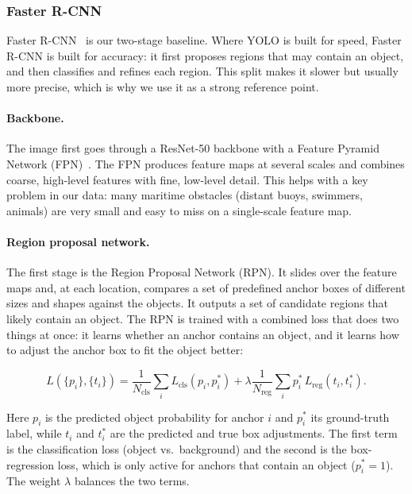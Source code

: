 \documentclass[11pt,a4paper]{article}
\begin{document}
\subsubsection{Faster R-CNN}
Faster R-CNN~\cite{fasterrcnn2015} is our two-stage baseline. Where YOLO is built
for speed, Faster R-CNN is built for accuracy: it first proposes regions that may
contain an object, and then classifies and refines each region. This split makes
it slower but usually more precise, which is why we use it as a strong reference
point.

\paragraph{Backbone.}
The image first goes through a ResNet-50 backbone with a Feature Pyramid Network
(FPN)~\cite{lin2017feature}. The FPN produces feature maps at several scales and
combines coarse, high-level features with fine, low-level detail. This helps with
a key problem in our data: many maritime obstacles (distant buoys, swimmers,
animals) are very small and easy to miss on a single-scale feature map.

\paragraph{Region proposal network.}
The first stage is the Region Proposal Network (RPN). It slides over the feature
maps and, at each location, compares a set of predefined anchor boxes of
different sizes and shapes against the objects. It outputs a set of candidate
regions that likely contain an object. The RPN is trained with a combined loss
that does two things at once: it learns whether an anchor contains an object, and
it learns how to adjust the anchor box to fit the object better:

\begin{equation}
L(\{p_i\}, \{t_i\}) = \frac{1}{N_{\text{cls}}} \sum_{i} L_{\text{cls}}(p_i, p_i^*)
  + \lambda \frac{1}{N_{\text{reg}}} \sum_{i} p_i^* \, L_{\text{reg}}(t_i, t_i^*).
\end{equation}

Here $p_i$ is the predicted object probability for anchor $i$ and $p_i^*$ its
ground-truth label, while $t_i$ and $t_i^*$ are the predicted and true box
adjustments. The first term is the classification loss (object vs.\ background)
and the second is the box-regression loss, which is only active for anchors that
contain an object ($p_i^* = 1$). The weight $\lambda$ balances the two terms.
\end{document}
